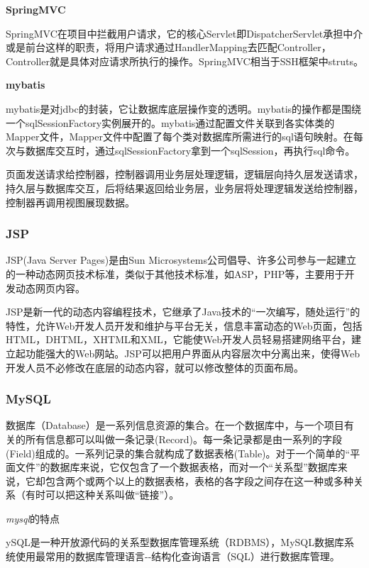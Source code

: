\documentclass[
]{article}
\begin{document}
\textbf{SpringMVC}

SpringMVC在项目中拦截用户请求，它的核心Servlet即DispatcherServlet承担中介或是前台这样的职责，将用户请求通过HandlerMapping去匹配Controller，Controller就是具体对应请求所执行的操作。SpringMVC相当于SSH框架中struts。

\textbf{mybatis}

mybatis是对jdbc的封装，它让数据库底层操作变的透明。mybatis的操作都是围绕一个sqlSessionFactory实例展开的。mybatis通过配置文件关联到各实体类的Mapper文件，Mapper文件中配置了每个类对数据库所需进行的sql语句映射。在每次与数据库交互时，通过sqlSessionFactory拿到一个sqlSession，再执行sql命令。

页面发送请求给控制器，控制器调用业务层处理逻辑，逻辑层向持久层发送请求，持久层与数据库交互，后将结果返回给业务层，业务层将处理逻辑发送给控制器，控制器再调用视图展现数据。

\hypertarget{jsp}{%
\subsubsection{JSP}\label{jsp}}

JSP(Java Server Pages)是由Sun
Microsystems公司倡导、许多公司参与一起建立的一种动态网页技术标准，类似于其他技术标准，如ASP，PHP等，主要用于开发动态网页内容。

JSP是新一代的动态内容编程技术，它继承了Java技术的``一次编写，随处运行''的特性，允许Web开发人员开发和维护与平台无关，信息丰富动态的Web页面，包括HTML，DHTML，XHTML和XML，它能使Web开发人员轻易搭建网络平台，建立起功能强大的Web网站。JSP可以把用户界面从内容层次中分离出来，使得Web开发人员不必修改在底层的动态内容，就可以修改整体的页面布局。

\hypertarget{mysql}{%
\subsubsection{MySQL}\label{mysql}}

数据库（Database）是一系列信息资源的集合。在一个数据库中，与一个项目有关的所有信息都可以叫做一条记录(Record)。每一条记录都是由一系列的字段(Field)组成的。一系列记录的集合就构成了数据表格(Table)。对于一个简单的``平面文件''的数据库来说，它仅包含了一个数据表格，而对一个``关系型''数据库来说，它却包含两个或两个以上的数据表格，表格的各字段之间存在这一种或多种关系（有时可以把这种关系叫做``链接''）。

\emph{mysql}的特点

ySQL是一种开放源代码的关系型数据库管理系统（RDBMS），MySQL数据库系统使用最常用的数据库管理语言-\/-结构化查询语言（SQL）进行数据库管理。
\end{document}
